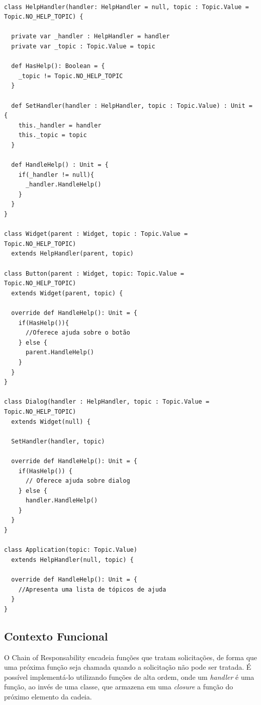\begin{lstlisting}[caption={Chain of Responsibility Orientação a Objetos},label=oochresponsibility]

class HelpHandler(handler: HelpHandler = null, topic : Topic.Value = Topic.NO_HELP_TOPIC) {

  private var _handler : HelpHandler = handler
  private var _topic : Topic.Value = topic

  def HasHelp(): Boolean = {
    _topic != Topic.NO_HELP_TOPIC
  }

  def SetHandler(handler : HelpHandler, topic : Topic.Value) : Unit = {
    this._handler = handler
    this._topic = topic
  }

  def HandleHelp() : Unit = {
    if(_handler != null){
      _handler.HandleHelp()
    }
  }
}

class Widget(parent : Widget, topic : Topic.Value = Topic.NO_HELP_TOPIC)
  extends HelpHandler(parent, topic)
  
class Button(parent : Widget, topic: Topic.Value = Topic.NO_HELP_TOPIC)
  extends Widget(parent, topic) {

  override def HandleHelp(): Unit = {
    if(HasHelp()){
      //Oferece ajuda sobre o botão
    } else {
      parent.HandleHelp()
    }
  }
}

class Dialog(handler : HelpHandler, topic : Topic.Value = Topic.NO_HELP_TOPIC)
  extends Widget(null) {

  SetHandler(handler, topic)

  override def HandleHelp(): Unit = {
    if(HasHelp()) {
      // Oferece ajuda sobre dialog
    } else {
      handler.HandleHelp()
    }
  }
}

class Application(topic: Topic.Value)
  extends HelpHandler(null, topic) {

  override def HandleHelp(): Unit = {
    //Apresenta uma lista de tópicos de ajuda
  }
}

\end{lstlisting}

\subsection*{Contexto Funcional}

O Chain of Responsability encadeia funções que 
tratam solicitações, de forma que uma próxima 
função seja chamada quando a solicitação não 
pode ser tratada. É possível implementá-lo 
utilizando funções de alta ordem, onde um 
\textit{handler} é uma função, ao invés de 
uma classe, que armazena em uma \textit{closure} 
a função do próximo elemento da cadeia. 

